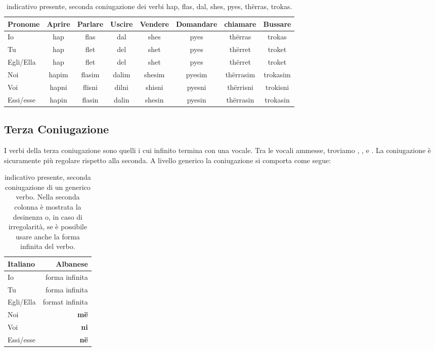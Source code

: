 \begin{table}[ht]
    \centering
    \begin{tabular}{lccccccc}
        \toprule
        Pronome     &   Aprire  & Parlare   & Uscire    & Vendere   & Domandare & chiamare & Bussare \\
        \midrule
        Io          &   hap     & flas      & dal       & shes      & pyes  & thërras   & trokas\\
        Tu          &   hap     & flet      & del       & shet      & pyes  & thërret   & troket\\
        Egli/Ella   &   hap     & flet      & del       & shet      & pyes &    thërret & troket\\
        Noi         &   hapim   & flasim    & dalim     & shesim    & pyesim    & thërrasim & trokasim\\
        Voi         &   hapni   & flisni    & dilni     & shisni    &pyesni     & thërrisni & trokisni\\
        Essi/esse   &   hapin   & flasin    & dalin     & shesin    & pyesin    & thërrasin & trokasin\\
        \bottomrule
    \end{tabular}
    \caption{indicativo presente, seconda coniugazione dei verbi hap, flas, dal, shes, pyes, thërras, trokas.}
    \label{tbl:verb:secondaconiugazione:indicativo:presente}
\end{table}

\subsection{Terza Coniugazione}

I verbi della terza coniugazione sono quelli i cui infinito termina con una vocale. Tra le vocali ammesse, troviamo , , e . La coniugazione è sicuramente più regolare rispetto alla seconda. A livello generico la coniugazione si comporta come segue:

\begin{table}[ht]
    \centering
    \begin{tabular}{lr}
        \toprule
        Italiano    &   Albanese\\
        \midrule
        Io          &   forma infinita \\
        Tu          &   forma infinita\\
        Egli/Ella   &   format infinita\\
        Noi         &   \textbf{më} \\
        Voi         &   \textbf{ni} \\
        Essi/esse   &   \textbf{në} \\
        \bottomrule
    \end{tabular}
    \caption{indicativo presente, seconda coniugazione di un generico verbo. Nella seconda colonna è mostrata la desinenza o, in caso di irregolarità, se è possibile usare anche la forma infinita del verbo.}
    \label{tbl:verb:secondaconiugazione:indicativo:presente}
\end{table}

